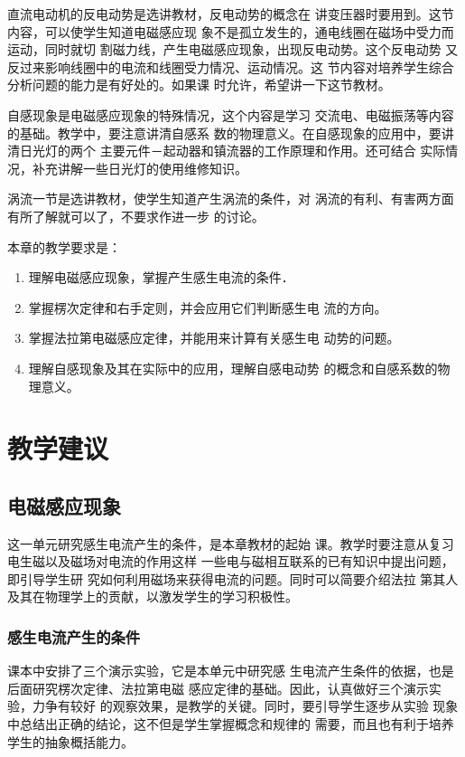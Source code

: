 直流电动机的反电动势是选讲教材，反电动势的概念在
讲变压器时要用到。这节内容，可以使学生知道电磁感应现
象不是孤立发生的，通电线圈在磁场中受力而运动，同时就切
割磁力线，产生电磁感应现象，出现反电动势。这个反电动势
又反过来影响线圈中的电流和线圈受力情况、运动情况。这
节内容对培养学生综合分析问题的能力是有好处的。如果课
时允许，希望讲一下这节教材。

自感现象是电磁感应现象的特殊情况，这个内容是学习
交流电、电磁振荡等内容的基础。教学中，要注意讲清自感系
数的物理意义。在自感现象的应用中，要讲清日光灯的两个
主要元件－起动器和镇流器的工作原理和作用。还可结合
实际情况，补充讲解一些日光灯的使用维修知识。

涡流一节是选讲教材，使学生知道产生涡流的条件，对
涡流的有利、有害两方面有所了解就可以了，不要求作进一步
的讨论。

本章的教学要求是：
\begin{enumerate}
\item 理解电磁感应现象，掌握产生感生电流的条件．
\item 掌握楞次定律和右手定则，并会应用它们判断感生电
流的方向。
\item 掌握法拉第电磁感应定律，并能用来计算有关感生电
动势的问题。
\item 理解自感现象及其在实际中的应用，理解自感电动势
的概念和自感系数的物理意义。
\end{enumerate}

\section{教学建议}
\subsection{电磁感应现象}
这一单元研究感生电流产生的条件，是本章教材的起始
课。教学时要注意从复习电生磁以及磁场对电流的作用这样
一些电与磁相互联系的已有知识中提出问题，即引导学生研
究如何利用磁场来获得电流的问题。同时可以简要介绍法拉
第其人及其在物理学上的贡献，以激发学生的学习积极性。

\subsubsection{感生电流产生的条件}
课本中安排了三个演示实验，它是本单元中研究感
生电流产生条件的依据，也是后面研究楞次定律、法拉第电磁
感应定律的基础。因此，认真做好三个演示实验，力争有较好
的观察效果，是教学的关键。同时，要引导学生逐步从实验
现象中总结出正确的结论，这不但是学生掌握概念和规律的
需要，而且也有利于培养学生的抽象概括能力。

